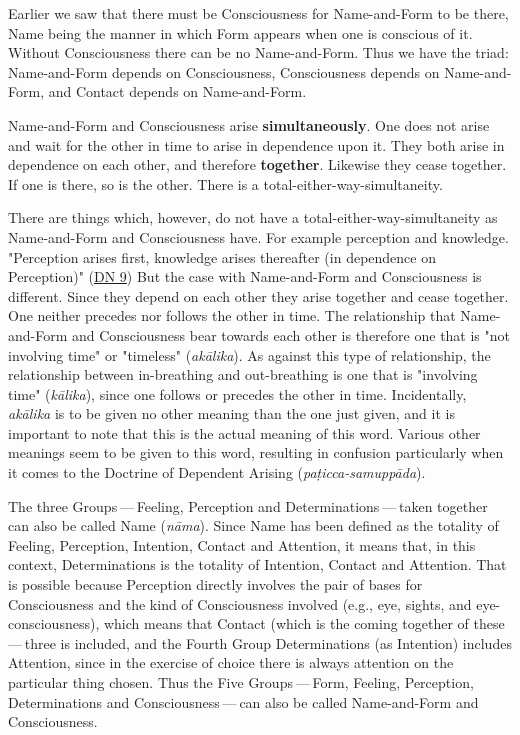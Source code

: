 Earlier we saw that there must be Consciousness for Name-and-Form to be there, Name being the manner in which Form appears when one is conscious of it. Without Consciousness there can be no Name-and-Form. Thus we have the triad: Name-and-Form depends on Consciousness, Consciousness depends on Name-and-Form, and Contact depends on Name-and-Form.

Name-and-Form and Consciousness arise \textbf{simultaneously}. One does not arise and wait for the other in time to arise in dependence upon it. They both arise in dependence on each other, and therefore \textbf{together}. Likewise they cease together. If one is there, so is the other. There is a total-either-way-simultaneity.

There are things which, however, do not have a total-either-way-simultaneity as Name-and-Form and Consciousness have. For example perception and knowledge. "Perception arises first, knowledge arises thereafter (in dependence on Perception)" (\href{https://suttacentral.net/dn9/en/thanissaro}{DN 9}) But the case with Name-and-Form and Consciousness is different. Since they depend on each other they arise together and cease together. One neither precedes nor follows the other in time. The relationship that Name-and-Form and Consciousness bear towards each other is therefore one that is "not involving time" or "timeless" (\emph{akālika}). As against this type of relationship, the relationship between in-breathing and out-breathing is one that is "involving time" (\emph{kālika}), since one follows or precedes the other in time. Incidentally, \emph{akālika} is to be given no other meaning than the one just given, and it is important to note that this is the actual meaning of this word. Various other meanings seem to be given to this word, resulting in confusion particularly when it comes to the Doctrine of Dependent Arising (\emph{paṭicca-samuppāda}).

The three Groups --- Feeling, Perception and Determinations --- taken together can also be called Name (\emph{nāma}). Since Name has been defined as the totality of Feeling, Perception, Intention, Contact and Attention, it means that, in this context, Determinations is the totality of Intention, Contact and Attention. That is possible because Perception directly involves the pair of bases for Consciousness and the kind of Consciousness involved (e.g., eye, sights, and eye-consciousness), which means that Contact (which is the coming together of these --- three is included, and the Fourth Group Determinations (as Intention) includes Attention, since in the exercise of choice there is always attention on the particular thing chosen. Thus the Five Groups --- Form, Feeling, Perception, Determinations and Consciousness --- can also be called Name-and-Form and Consciousness.

